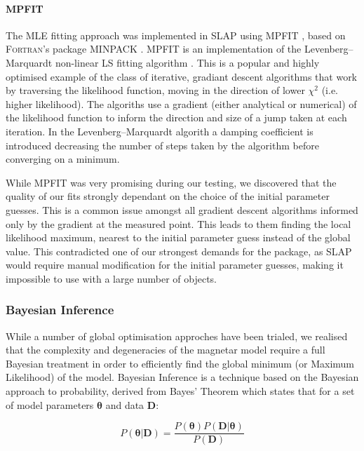 \paragraph{MPFIT} \label{sec:MPFIT}
The MLE fitting approach was implemented in \textsc{SLAP} using \textsc{MPFIT} \citep{ Markwardt2008}, based on \textsc{Fortran}'s package \textsc{MINPACK} \citep{More1980}. \textsc{MPFIT} is an implementation of the Levenberg–Marquardt non-linear LS fitting algorithm \citep{Levenberg1944,Marquardt1963}. This is a popular and highly optimised example of the class of iterative, gradiant descent algorithms that work by traversing the likelihood function, moving in the direction of lower $\chi^2$ (i.e. higher likelihood). The algoriths use a gradient (either analytical or numerical) of the likelihood function to inform the direction and size of a jump taken at each iteration. In the Levenberg–Marquardt algorith a damping coefficient is introduced decreasing the number of steps taken by the algorithm before converging on a minimum.

While \textsc{MPFIT} was very promising during our testing, we discovered that the quality of our fits strongly dependant on the choice of the initial parameter guesses. This is a common issue amongst all gradient descent algorithms informed only by the gradient at the measured point. This leads to them finding the local likelihood maximum, nearest to the initial parameter guess instead of the global value. This contradicted one of our strongest demands for the package, as \textsc{SLAP} would require manual modification for the initial parameter guesses, making it impossible to use with a large number of objects.

\subsubsection{Bayesian Inference}
While a number of global optimisation approches have been trialed, we realised that the complexity and degeneracies of the magnetar model require a full Bayesian treatment in order to efficiently find the global minimum (or Maximum Likelihood) of the model. Bayesian Inference is a technique based on the Bayesian approach to probability, derived from Bayes' Theorem which states that for a set of model parameters $\mathbf{\theta}$ and data $\mathbf{D}$:

\begin{equation}
  P(\mathbf{\theta}|\mathbf{D}) = \frac{P(\mathbf{\theta}) P(\mathbf{D}|\mathbf{\theta})}{P(\mathbf{D})}
\end{equation}

